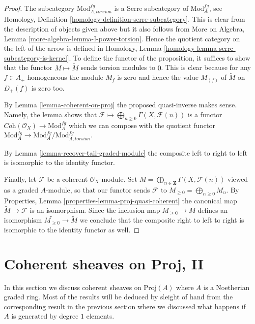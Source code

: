 \documentclass{stacks-project}
\theoremstyle{plain}
\theoremstyle{definition}
\theoremstyle{remark}
\numberwithin{equation}{subsection}
\begin{document}
\begin{proof}
The subcategory $\text{Mod}^{fg}_{A, torsion}$ is a Serre subcategory
of $\text{Mod}^{fg}_A$, see
Homology, Definition \ref{homology-definition-serre-subcategory}.
This is clear from the description of objects given above but it also follows
from More on Algebra, Lemma \ref{more-algebra-lemma-I-power-torsion}.
Hence the quotient category on the left of the arrow is defined
in Homology, Lemma \ref{homology-lemma-serre-subcategory-is-kernel}.
To define the functor of the proposition, it suffices to show that
the functor $M \mapsto \widetilde M$ sends torsion modules to $0$.
This is clear because for any $f \in A_+$ homogeneous the
module $M_f$ is zero and hence the value $M_{(f)}$ of $\widetilde M$
on $D_+(f)$ is zero too.

\medskip\noindent
By Lemma \ref{lemma-coherent-on-proj} the proposed quasi-inverse
makes sense. Namely, the lemma shows that
$\mathcal{F} \longmapsto \bigoplus_{n \geq 0} \Gamma(X, \mathcal{F}(n))$
is a functor $\textit{Coh}(\mathcal{O}_X) \to \text{Mod}^{fg}_A$
which we can compose with the quotient functor
$\text{Mod}^{fg}_A \to \text{Mod}^{fg}_A/\text{Mod}^{fg}_{A, torsion}$.

\medskip\noindent
By Lemma \ref{lemma-recover-tail-graded-module}
the composite left to right to left is isomorphic to the identity functor.

\medskip\noindent
Finally, let $\mathcal{F}$ be a coherent $\mathcal{O}_X$-module.
Set $M = \bigoplus_{n \in \mathbf{Z}} \Gamma(X, \mathcal{F}(n))$
viewed as a graded $A$-module, so that our functor sends $\mathcal{F}$ to
$M_{\geq 0} = \bigoplus_{n \geq 0} M_n$.
By Properties, Lemma \ref{properties-lemma-proj-quasi-coherent}
the canonical map $\widetilde M \to \mathcal{F}$
is an isomorphism. Since the inclusion map
$M_{\geq 0} \to M$ defines an isomorphism
$\widetilde{M_{\geq 0}} \to \widetilde M$ we conclude that
the composite right to left to right is isomorphic to the identity
functor as well.
\end{proof}





\section{Coherent sheaves on Proj, II}
\label{section-coherent-proj-general}

\noindent
In this section we discuss coherent sheaves on $\text{Proj}(A)$
where $A$ is a Noetherian graded ring. Most of the results will
be deduced by sleight of hand from the corresponding result in the
previous section where we discussed what happens if $A$ is generated
by degree $1$ elements.
\end{document}
